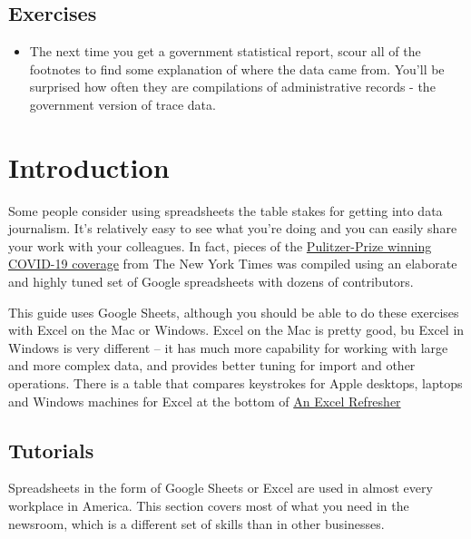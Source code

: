 \documentclass[
  letterpaper,
  DIV=11,
  numbers=noendperiod]{scrreprt}
\providecommand{\tightlist}{%
  \setlength{\itemsep}{0pt}\setlength{\parskip}{0pt}}\usepackage{longtable,booktabs,array}
\begin{document}
\hypertarget{exercises-2}{%
\section{Exercises}\label{exercises-2}}

\begin{itemize}
\tightlist
\item
  The next time you get a government statistical report, scour all of
  the footnotes to find some explanation of where the data came from.
  You'll be surprised how often they are compilations of administrative
  records - the government version of trace data.
\end{itemize}


\hypertarget{introduction-1}{%
\chapter{Introduction}\label{introduction-1}}

Some people consider using spreadsheets the table stakes for getting
into data journalism. It's relatively easy to see what you're doing and
you can easily share your work with your colleagues. In fact, pieces of
the
\href{https://www.pulitzer.org/winners/new-york-times-6}{Pulitzer-Prize
winning COVID-19 coverage} from The New York Times was compiled using an
elaborate and highly tuned set of Google spreadsheets with dozens of
contributors.

This guide uses Google Sheets, although you should be able to do these
exercises with Excel on the Mac or Windows. Excel on the Mac is pretty
good, bu Excel in Windows is very different -- it has much more
capability for working with large and more complex data, and provides
better tuning for import and other operations. There is a table that
compares keystrokes for Apple desktops, laptops and Windows machines for
Excel at the bottom of \href{xl-refresher}{An Excel Refresher}

\hypertarget{tutorials}{%
\section{Tutorials}\label{tutorials}}

Spreadsheets in the form of Google Sheets or Excel are used in almost
every workplace in America. This section covers most of what you need in
the newsroom, which is a different set of skills than in other
businesses.
\end{document}
